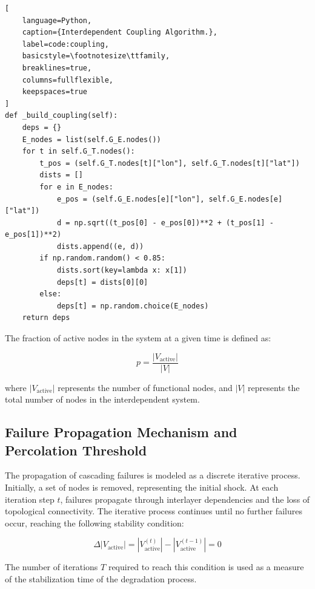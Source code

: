 \documentclass[journal]{IEEEtran}
\begin{document}
\begin{lstlisting}[
    language=Python, 
    caption={Interdependent Coupling Algorithm.}, 
    label=code:coupling,
    basicstyle=\footnotesize\ttfamily, 
    breaklines=true,                   
    columns=fullflexible,              
    keepspaces=true
]
def _build_coupling(self):
    deps = {}
    E_nodes = list(self.G_E.nodes())
    for t in self.G_T.nodes():
        t_pos = (self.G_T.nodes[t]["lon"], self.G_T.nodes[t]["lat"])
        dists = []
        for e in E_nodes:
            e_pos = (self.G_E.nodes[e]["lon"], self.G_E.nodes[e]["lat"])
            d = np.sqrt((t_pos[0] - e_pos[0])**2 + (t_pos[1] - e_pos[1])**2)
            dists.append((e, d))
        if np.random.random() < 0.85:
            dists.sort(key=lambda x: x[1])
            deps[t] = dists[0][0]
        else:
            deps[t] = np.random.choice(E_nodes)
    return deps
\end{lstlisting}


The fraction of active nodes in the system at a given time is defined as:

\begin{equation}
p = \frac{|V_{\mathrm{active}}|}{|V|}
\label{eq:occupation}
\end{equation}


where $|V_{\mathrm{active}}|$ represents the number of functional nodes, and $|V|$ represents the total number of nodes in the interdependent system.

\subsection{Failure Propagation Mechanism and Percolation Threshold}
The propagation of cascading failures is modeled as a discrete iterative process. Initially, a set of nodes is removed, representing the initial shock. At each iteration step $t$, failures propagate through interlayer dependencies and the loss of topological connectivity. The iterative process continues until no further failures occur, reaching the following stability condition:


\begin{equation}
\Delta \left|V_{\mathrm{active}}\right| = \left|V_{\mathrm{active}}^{(t)}\right| - \left|V_{\mathrm{active}}^{(t-1)}\right| = 0
\label{eq:stability}
\end{equation}

The number of iterations $T$ required to reach this condition is used as a measure of the stabilization time of the degradation process.
\end{document}
